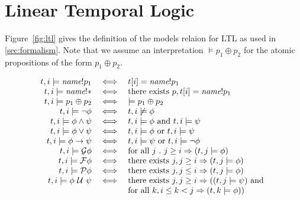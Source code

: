 \documentclass{llncs}
\newcommand{\sch}{\textit{name}}
\newcommand{\tr}{t\xspace}
\newcommand{\talways}{\mathcal{G}}
\newcommand{\tfuture}{\mathcal{F}}
\newcommand{\tuntil}{~\mathcal{U}~}
\newcommand{\tpast}{\mathcal{P}}
\newcommand{\limplies}{\rightarrow}
\newcommand{\mimplies}{\Rightarrow}
\begin{document}
\section{Linear Temporal Logic}
\label{sec:ltl}

Figure~\ref{fig:ltl} gives the definition of the models relaion for
LTL as used in \ref{sec:formalism}.  Note that we assume an
interpretation $\models p_1 \oplus p_2$ for the atomic propositions of
the form $p_1 \oplus p_2$.

\begin{figure}[!t]
  \small
  \begin{displaymath}
    \begin{array}{rcl}
      \tr , i \models \sch {!}p_1 & \iff & \tr[i] = \sch {!}p_1 \\
      \tr , i \models \sch {!}* & \iff & \hbox{there exists } p,
      \tr[i] = \sch {!}p_1 \\
      \tr , i \models p_1 \oplus p_2 & \iff & \models p_1 \oplus p_2 \\
      
      \tr, i \models \neg \phi & \iff &
      \tr, i  \not \models \phi \\

      \tr, i  \models \phi \land \psi & \iff &
      \tr, i  \models \phi \hbox{ and } \tr, i  \models \psi \\

      \tr, i  \models \phi \lor \psi & \iff &
      \tr, i  \models \phi \hbox{ or } \tr, i  \models \psi \\

      \tr, i  \models \phi \limplies \psi & \iff &
      \tr, i  \models \psi \hbox{ or } \tr, i  \models
      \lnot \phi \\

      \tr, i  \models \talways \phi & \iff &
      \hbox{for all } j ~.~ j \geq i \mimplies (\tr, j  \models \phi) \\

      \tr, i  \models \tfuture \phi & \iff &
      \hbox{there exists } j, j \geq i \mimplies (\tr, j  \models \phi) \\

      \tr, i  \models \tpast \phi & \iff &
      \hbox{there exists } j, j \leq i \mimplies (\tr, j  \models \phi) \\

      \tr, i  \models \phi \tuntil \psi & \iff &
      \hbox{there exists } j, j \geq i \mimplies ((\tr, j  \models \psi)
      \hbox{ and } \\
      & & \hbox{for all } k, i \leq k < j \mimplies (\tr, k 
      \models \phi)) \\


\end{array}
\end{displaymath}
\end{figure}
\end{document}
